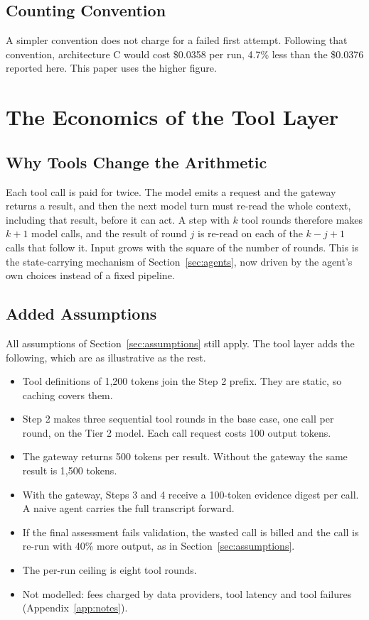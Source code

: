 \documentclass[conference]{IEEEtran}
\begin{document}
\subsection{Counting Convention}
\label{sec:convention}

A simpler convention does not charge for a failed first attempt. Following that convention, architecture C would cost \$0.0358 per run, 4.7\% less than the \$0.0376 reported here. This paper uses the higher figure.

\section{The Economics of the Tool Layer}
\label{sec:tools-econ}

\subsection{Why Tools Change the Arithmetic}

Each tool call is paid for twice. The model emits a request and the gateway returns a result, and then the next model turn must re-read the whole context, including that result, before it can act. A step with $k$ tool rounds therefore makes $k+1$ model calls, and the result of round $j$ is re-read on each of the $k-j+1$ calls that follow it. Input grows with the square of the number of rounds. This is the state-carrying mechanism of Section~\ref{sec:agents}, now driven by the agent's own choices instead of a fixed pipeline.

\subsection{Added Assumptions}

All assumptions of Section~\ref{sec:assumptions} still apply. The tool layer adds the following, which are as illustrative as the rest.
\begin{itemize}
\item Tool definitions of 1,200 tokens join the Step 2 prefix. They are static, so caching covers them.
\item Step 2 makes three sequential tool rounds in the base case, one call per round, on the Tier 2 model. Each call request costs 100 output tokens.
\item The gateway returns 500 tokens per result. Without the gateway the same result is 1,500 tokens.
\item With the gateway, Steps 3 and 4 receive a 100-token evidence digest per call. A naive agent carries the full transcript forward.
\item If the final assessment fails validation, the wasted call is billed and the call is re-run with 40\% more output, as in Section~\ref{sec:assumptions}.
\item The per-run ceiling is eight tool rounds.
\item Not modelled: fees charged by data providers, tool latency and tool failures (Appendix~\ref{app:notes}).
\end{itemize}
\end{document}

